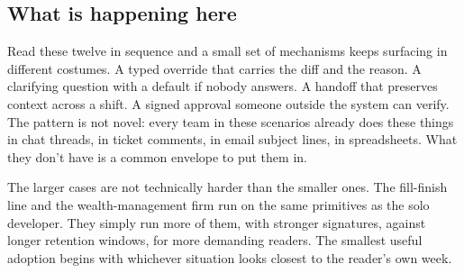 \documentclass[11pt]{article}
\begin{document}
\subsection*{What is happening here}

Read these twelve in sequence and a small set of mechanisms keeps surfacing in different costumes. A typed override that carries the diff and the reason. A clarifying question with a default if nobody answers. A handoff that preserves context across a shift. A signed approval someone outside the system can verify. The pattern is not novel: every team in these scenarios already does these things in chat threads, in ticket comments, in email subject lines, in spreadsheets. What they don't have is a common envelope to put them in.

The larger cases are not technically harder than the smaller ones. The fill-finish line and the wealth-management firm run on the same primitives as the solo developer. They simply run more of them, with stronger signatures, against longer retention windows, for more demanding readers. The smallest useful adoption begins with whichever situation looks closest to the reader's own week.
\end{document}
